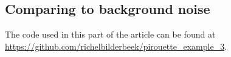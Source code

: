 





\subsection{Comparing to background noise}

The code used in this part of the article can be found at 
\url{https://github.com/richelbilderbeek/pirouette_example_3}.


